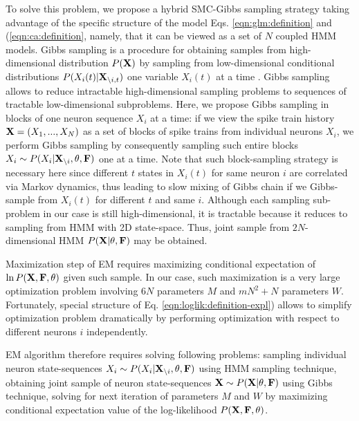 To solve this problem, we propose a hybrid SMC-Gibbs sampling strategy taking advantage of the specific structure of the model Eqs. \eqref{eqn:glm:definition} and (\ref{eqn:ca:definition}, namely, that it can be viewed as a set of $N$ coupled HMM models. Gibbs sampling is a procedure for obtaining samples from high-dimensional distribution $P({\bf X})$ by sampling from low-dimensional conditional distributions $P(X_{i}(t)|{\bf X}_{\backslash i, t})$ one variable $X_{i}(t)$ at a time \cite{Gelfand1990}.  Gibbs sampling allows to reduce intractable high-dimensional sampling problems to sequences of tractable low-dimensional subproblems.  Here, we propose Gibbs sampling in blocks of one neuron sequence $X_{i}$ at a time: if we view the spike train history ${\bf X}=(X_1, ..., X_N)$ as a set of blocks of spike trains from individual neurons $X_i$, we perform Gibbs sampling by consequently sampling such entire blocks $X_i\sim P(X_{i}|{\bf X}_{\backslash i}, \mathbf{\theta}, {\bf F})$ one at a time.  Note that such block-sampling strategy is necessary here since different $t$ states in $X_i(t)$ for same neuron $i$ are correlated via Markov dynamics, thus leading to slow mixing of Gibbs chain if we Gibbs-sample from $X_i(t)$ for different $t$ and same $i$.  Although each sampling sub-problem in our case is still high-dimensional, it is tractable because it reduces to sampling from HMM with 2D state-space. Thus, joint sample from $2N$-dimensional HMM $P({\bf X}|\mathbf{\theta}, {\bf F})$ may be obtained.

Maximization step of EM requires maximizing conditional expectation of $\ln P({\bf X}, {\bf F}, \mathbf{\theta})$ given such sample. In our case, such maximization is a very large optimization problem involving $6N$ parameters $M$ and $mN^2+N$ parameters $W$. Fortunately, special structure of Eq. \eqref{eqn:loglik:definition-expl}) allows to simplify optimization problem dramatically by performing optimization with respect to different neurons $i$ independently.

EM algorithm therefore requires solving following problems: sampling individual neuron state-sequences $X_i\sim P(X_{i}|{\bf X}_{\backslash i}, \mathbf{\theta}, {\bf F})$ using HMM sampling technique, obtaining joint sample of neuron state-sequences ${\bf X}\sim P({\bf X}|\mathbf{\theta}, {\bf F})$ using Gibbs technique, solving for next iteration of parameters $M$ and $W$ by maximizing conditional expectation value of the log-likelihood $P({\bf X}, {\bf F}, \mathbf{\theta})$.

